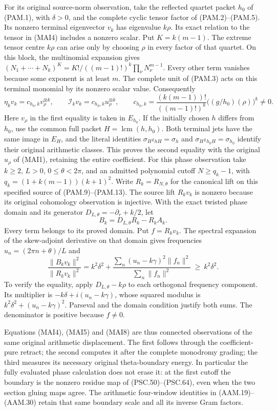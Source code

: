 For its original source-norm observation, take the reflected
quartet packet $h_0$ of (PAM.1), with $\delta>0$, and the complete
cyclic tensor factor of (PAM.2)--(PAM.5). Its nonzero terminal
eigenvector $v_k$ has eigenvalue $k\rho$. Its exact relation to
the tensor in (MAI4) includes a nonzero scalar. Put $K=k(m-1)$.
The extreme tensor centre $k\rho$ can arise only by choosing
$\rho$ in every factor of that quartet. On this block, the
multinomial expansion gives
$(N_1+\cdots+N_k)^K=K!/((m-1)!)^k\prod_\nu N_\nu^{m-1}$.
Every other term vanishes because some exponent is at least $m$.
The complete unit of (PAM.3) acts on this terminal monomial by
its nonzero scalar value. Consequently
\[
 \eta_kv_k=c_{h_0,k}v_\rho^{\otimes k},\qquad
 \mathcal I_kv_k=c_{h_0,k}u_\rho^{\otimes k},\qquad
 c_{h_0,k}=\frac{(k(m-1))!}{((m-1)!)^k}
                    \bigl((g/h_0)(\rho)\bigr)^k\ne0.
 \tag{MAI6a}
\]
Here $v_\rho$ in the first equality is taken in $E_{h_0}$.
If the initially chosen $h$ differs from $h_0$, use the common
full packet $H=\operatorname{lcm}(h,h_0)$. Both terminal jets
have the same image in $E_H$, and the literal identities
$\sigma_H\iota_{hH}=\sigma_h$ and
$\sigma_H\iota_{h_0H}=\sigma_{h_0}$ identify their original
arithmetic classes. This proves the second equality with the
original $u_\rho$ of (MAI1), retaining the entire coefficient.
For this phase observation take $k\geq2$, $L>0$,
$0\leq\theta<2\pi$, and an admitted polynomial cutoff
$N\geq q_k-1$, with $q_k=(1+k(m-1))(k+1)^2$.
Write $R_k=R_{N,\theta}$ for the canonical lift on this specified
source of (PAM.9)--(PAM.13). The source lift
$R_kv_k$ is nonzero because its original cohomology observation
is injective. With the exact twisted phase domain and its
generator $D_{L,\theta}=-\partial_r+k/2$, let
\[
 B_k=D_{L,\theta}R_k-R_kA_k.
 \tag{MAI7}
\]
Every term belongs to its proved domain. Put $f=R_kv_k$.
The spectral expansion of the skew-adjoint derivative on that
domain gives frequencies $u_n=(2\pi n+\theta)/L$ and
\[
 \frac{\|B_kv_k\|^2}{\|R_kv_k\|^2}
 =k^2\delta^2+
   \frac{\sum_n(u_n-k\gamma)^2\|f_n\|^2}
        {\sum_n\|f_n\|^2}
 \ \geq\ k^2\delta^2.
 \tag{MAI8}
\]
To verify the equality, apply $D_{L,\theta}-k\rho$ to each
orthogonal frequency component. Its multiplier is
$-k\delta+i(u_n-k\gamma)$, whose squared modulus is
$k^2\delta^2+(u_n-k\gamma)^2$. Parseval and the domain
condition justify both sums. The denominator is positive
because $f\ne0$.

Equations (MAI4), (MAI5) and (MAI8) are thus connected
observations of the same original arithmetic displacement.
The first follows through the coefficient-pure retract; the
second computes it after the complete monodromy grading; the
third measures its necessary original theta-boundary energy.
In particular the fully evaluated phase calculation does not
erase it: at the first cutoff the boundary is the nonzero
residue map of (PSC.50)--(PSC.64), even when the two section
gluing maps agree. The arithmetic four-window identities in
(AAM.19)--(AAM.30) retain that same boundary scale and all its
inverse Gram factors.

